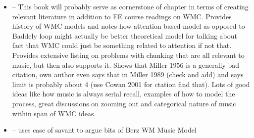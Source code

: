 \documentclass[]{book}
\theoremstyle{definition}
\theoremstyle{definition}
\theoremstyle{definition}
\theoremstyle{remark}
\begin{document}
\begin{itemize}
\item
  \citep{cowanWorkingMemoryCapacity2005} -- This book will probably
  serve as cornerstone of chapter in terms of creating relevant
  literature in addition to EE course readings on WMC. Provides history
  of WMC models and notes how attention based model as opposed to
  Baddely loop might actually be better theoretical model for talking
  about fact that WMC could just be something related to attention if
  not that. Provides extensive listing on problems with chunking that
  are all relevant to music, but then also supports it. Shows that
  Miller 1956 is a generally bad citation, own author even says that in
  Miller 1989 (check and add) and says limit is probably about 4 (use
  Cowan 2001 for ctation find that). Lots of good ideas like how music
  is always serial recall, examples of how to model the process, great
  discussions on zooming out and categorical nature of music within span
  of WMC ideas.
\item
  \citep{ockelfordMusicModuleWorking2007} -- uses case of savant to
  argue bits of Berz WM Music Model
\end{itemize}


\end{document}
